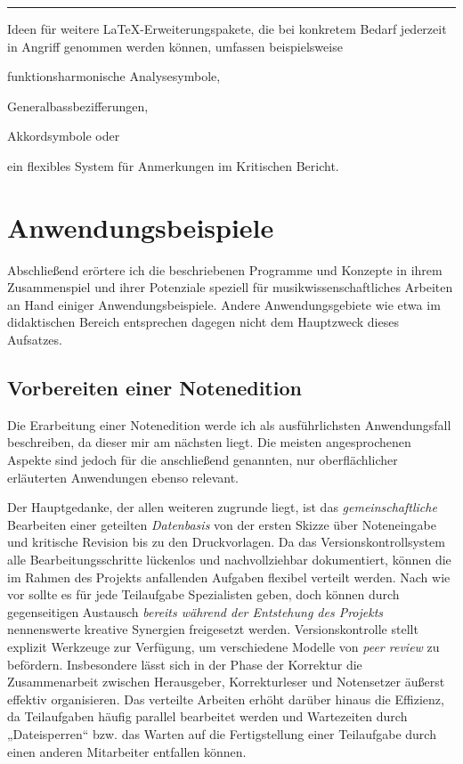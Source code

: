 \documentclass[DIV=12]{scrreprt}
\begin{document}
\bigskip
\hrule
\bigskip
Ideen für weitere \LaTeX-Erweiterungspakete, die bei konkretem Bedarf jederzeit in Angriff genommen werden können, umfassen beispielsweise 

\begin{itemize*}
\item funktionsharmonische Analysesymbole,
\item Generalbassbezifferungen,
\item Akkordsymbole oder
\item ein flexibles System für Anmerkungen im Kritischen Bericht.
\end{itemize*}

\chapter{Anwendungsbeispiele}
\label{chap:pt_applications}

Abschließend erörtere ich die beschriebenen Programme und Konzepte in ihrem Zusammenspiel und ihrer Potenziale speziell für musikwissenschaftliches Arbeiten an Hand einiger Anwendungsbeispiele.
Andere Anwendungsgebiete wie etwa im didaktischen Bereich entsprechen dagegen nicht dem Hauptzweck dieses Aufsatzes.

\section{Vorbereiten einer Notenedition}
\label{sec:pt_preparing-edition}
Die Erarbeitung einer Notenedition werde ich als ausführlichsten Anwendungsfall beschreiben, da dieser mir am nächsten liegt.
Die meisten angesprochenen Aspekte sind jedoch für die anschließend genannten, nur oberflächlicher erläuterten Anwendungen ebenso relevant.

\medskip
 
Der Hauptgedanke, der allen weiteren zugrunde liegt, ist das \emph{gemeinschaftliche} Bearbeiten einer geteilten \emph{Datenbasis} von der ersten Skizze über Noteneingabe und kritische Revision bis zu den Druckvorlagen.
Da das Versionskontrollsystem alle Bearbeitungsschritte lückenlos und nachvollziehbar dokumentiert, können die im Rahmen des Projekts anfallenden Aufgaben flexibel verteilt werden.
Nach wie vor sollte es für jede Teilaufgabe Spezialisten geben, doch können durch gegenseitigen Austausch \emph{bereits während der Entstehung des Projekts} nennenswerte kreative Synergien freigesetzt werden.
Versionskontrolle stellt explizit Werkzeuge zur Verfügung, um verschiedene Modelle von \emph{peer review} zu befördern.
Insbesondere lässt sich in der Phase der Korrektur die Zusammenarbeit zwischen Herausgeber, Korrekturleser und Notensetzer äußerst effektiv organisieren.
Das verteilte Arbeiten erhöht darüber hinaus die Effizienz, da Teilaufgaben häufig parallel bearbeitet werden und Wartezeiten durch „Dateisperren“ bzw. das Warten auf die Fertigstellung einer Teilaufgabe durch einen anderen Mitarbeiter entfallen können.
\end{document}
